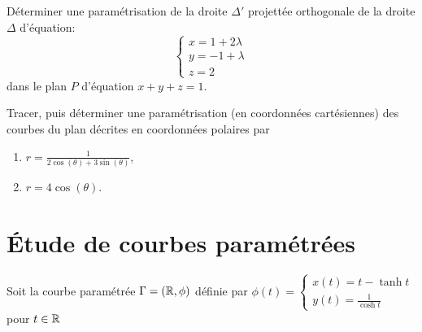 \documentclass{tp_um}
\begin{document}
\newpage

\exo{} Déterminer une paramétrisation de la droite $\Delta'$ projettée orthogonale de la droite $\Delta$ d'équation:
\[
    \begin{cases}
        x = 1 + 2 \lambda \\
        y = -1 + \lambda \\
        z = 2
    \end{cases}
\]
dans le plan $P$ d'équation $x+y+z =1$.

\newpage

\exo{} Tracer, puis déterminer une paramétrisation (en coordonnées cartésiennes) des courbes du plan décrites en coordonnées polaires par
\begin{enumerate}
    \item	$r = \frac{1}{2\cos(\theta) + 3\sin(\theta)}$, %
    \item	$r = 4\cos(\theta)$.
\end{enumerate}
\newpage

\section{Étude de courbes paramétrées}

\exo{}  Soit la courbe paramétrée $\Gamma=\left( \mathbb{R}, \phi \right)$ définie par $ \phi(t) = \begin{cases}x(t)= t - \tanh t \\ y(t) = \frac{1}{\cosh t} \end{cases}$ pour $t\in\mathbb{R}$
\end{document}
